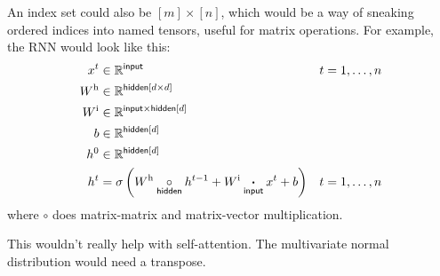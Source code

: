 An index set could also be $[m] \times [n]$, which would be a way of sneaking ordered indices into named tensors, useful for matrix operations. For example, the RNN would look like this:
\begin{align*}
x^{t} &\in \mathbb{R}^{\mathsf{input}} & t &= 1, \ldots, n \\
W^{\text{h}} &\in \mathbb{R}^{\mathsf{hidden}[d \times d]} \\
W^{\text{i}} &\in \mathbb{R}^{\mathsf{input} \times \mathsf{hidden}[d]} \\
b &\in \mathbb{R}^{\mathsf{hidden}[d]} \\
h^{0} &\in \mathbb{R}^{\mathsf{hidden}[d]} \\
h^{t} &= \sigma\left( W^{\text{h}} \mathbin{\mathop{\circ}\limits_{\mathsf{hidden}}} h^{t-1} + W^{\text{i}} \mathbin{\mathop{\boldsymbol\cdot}\limits_{\mathsf{input}}} x^{t} + b \right) & t &= 1, \ldots, n
\end{align*}
where $\circ$ does matrix-matrix and matrix-vector multiplication.

This wouldn't really help with self-attention. The multivariate normal distribution would need a transpose.
